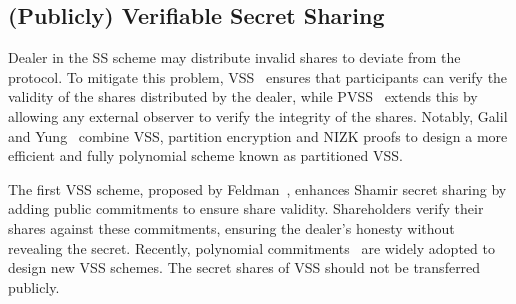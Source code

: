 \documentclass[runningheads]{llncs}
\begin{document}



\subsection{(Publicly) Verifiable Secret Sharing}
Dealer in the SS scheme may distribute invalid shares to deviate from the protocol.
To mitigate this problem, VSS~\cite{Feldman1987VSS,Abraham2023VSS} ensures that participants can verify the validity of the shares distributed by the dealer, while PVSS~\cite{Stadler1996PVSS,Cascudo2017PVSS} extends this by allowing any external observer to verify the integrity of the shares. Notably, Galil and Yung~\cite{Galil1987} combine VSS, partition encryption and NIZK proofs to design a more efficient and fully polynomial scheme known as partitioned VSS.


The first VSS scheme, proposed by Feldman~\cite{Feldman1987VSS}, enhances Shamir secret sharing by adding public commitments to ensure share validity. Shareholders verify their shares against these commitments, ensuring the dealer's honesty without revealing the secret.
Recently, polynomial commitments~\cite{Kate2010VSS,Abraham2023VSS,Zhang2024VSS} are widely adopted to design new VSS schemes. The secret shares of VSS should not be transferred publicly.
\end{document}
